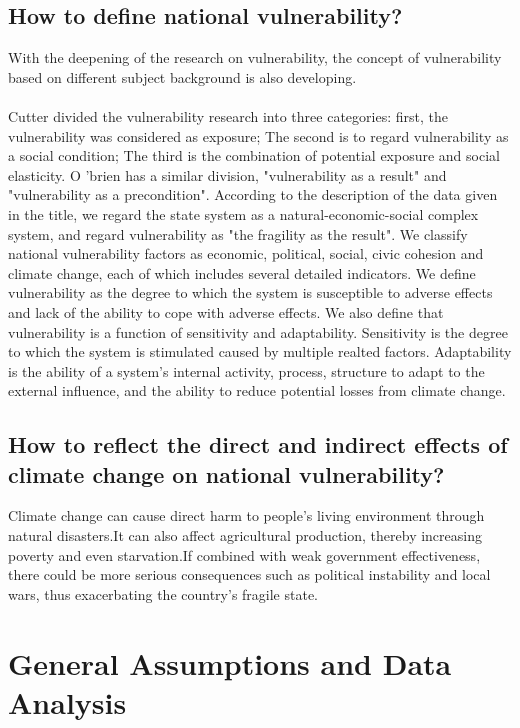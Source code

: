 \documentclass{mcmthesis}
\newcommand{\upcite}[1]{\textsuperscript{\textsuperscript{\cite{#1}}}}
\begin{document}
\subsection{How to define national vulnerability?}
With the deepening of the research on vulnerability, the concept of vulnerability 
based on different subject background is also developing.\\\\
Cutter divided the vulnerability research into three categories: first, the 
vulnerability was considered as exposure; The second is to regard vulnerability 
as a social condition; The third is the combination of potential exposure 
and social elasticity.\upcite{bib18} O 'brien has a similar division, "vulnerability 
as a result" and "vulnerability as a precondition".\upcite{bib19} According to the 
description of the data given in the title, we regard the state system as a 
natural-economic-social complex system, and regard vulnerability as "the fragility 
as the result". We classify national vulnerability factors as economic, political, 
social, civic cohesion and climate change, each of which includes several detailed 
indicators. We define vulnerability as the degree to which the system is susceptible 
to adverse effects and lack of the ability to cope with adverse effects. We also 
define that vulnerability is a function of sensitivity and adaptability. 
Sensitivity is the degree to which the system is stimulated caused by multiple 
realted factors. Adaptability is the ability of a system's internal activity, 
process, structure to adapt to the external influence, and the ability to reduce 
potential losses from climate change.
\subsection{How to reflect the direct and indirect effects of climate change on national vulnerability?}
Climate change can cause direct harm to people's living environment through natural 
disasters.It can also affect agricultural production, thereby increasing 
poverty and even starvation.If combined with weak government effectiveness, 
there could be more serious consequences such as political instability and 
local wars, thus exacerbating the country's fragile state.
\section{General Assumptions and Data Analysis}
\end{document}
